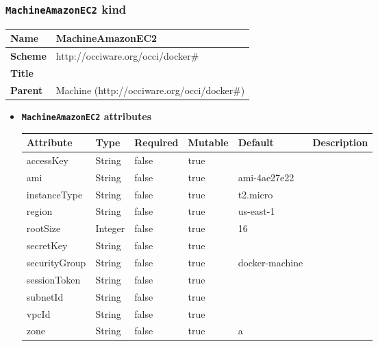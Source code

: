 \subsubsection{\texttt{MachineAmazonEC2} kind}
\begin{center}
\begin{tabular}{|l|l|}
  \hline
  \textbf{Name} & MachineAmazonEC2 \\
  \hline  
  \textbf{Scheme} & http://occiware.org/occi/docker\# \\
  \hline
  \textbf{Title} &  \\
  \hline
  \textbf{Parent} & Machine (http://occiware.org/occi/docker\#) \\
  \hline
\end{tabular}
\end{center}
\begin{itemize}
\item \textbf{\texttt{MachineAmazonEC2} attributes}

\begin{tabularx}{\textwidth}{|l|l|p{1.4cm}|p{1.3cm}|l|X|}
  \hline
  \textbf{Attribute} & \textbf{Type} & \textbf{Required} & \textbf{Mutable} & \textbf{Default} & \textbf{Description} \\
  \hline  
  accessKey & String & false & true &  &  \\
  \hline
  ami & String & false & true & ami-4ae27e22 &  \\
  \hline
  instanceType & String & false & true & t2.micro &  \\
  \hline
  region & String & false & true & us-east-1 &  \\
  \hline
  rootSize & Integer & false & true & 16 &  \\
  \hline
  secretKey & String & false & true &  &  \\
  \hline
  securityGroup & String & false & true & docker-machine &  \\
  \hline
  sessionToken & String & false & true &  &  \\
  \hline
  subnetId & String & false & true &  &  \\
  \hline
  vpcId & String & false & true &  &  \\
  \hline
  zone & String & false & true & a &  \\
  \hline
\end{tabularx}
\end{itemize}



